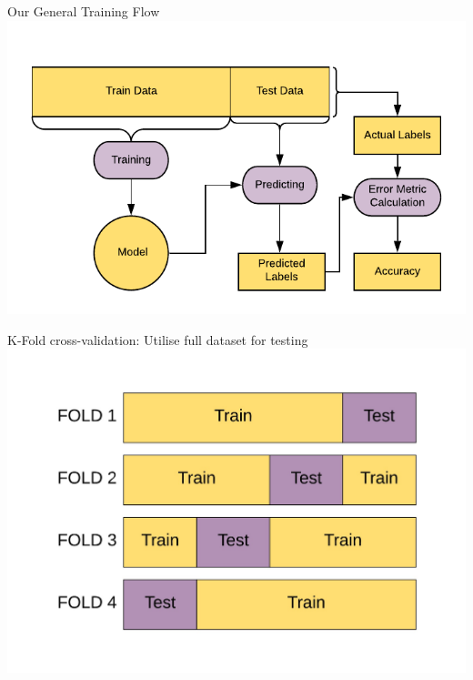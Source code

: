 \documentclass{beamer}
\begin{document}
	\begin{frame}{Our General Training Flow}
	\includegraphics[width = \textwidth]{../assets/bias-variance/diagrams/general-workflow}
	\end{frame}

	\begin{frame}{K-Fold cross-validation: Utilise full dataset for testing}
	\includegraphics[width = \textwidth]{../assets/bias-variance/diagrams/cross-validation-train-test.pdf}
	\end{frame}
\end{document}
